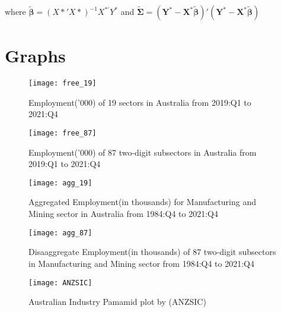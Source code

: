 \documentclass{monashthesis}
\begin{document}
where \(\boldsymbol{\tilde\beta} =(X*'X*)^{-1}X^{*'}Y^*\) and \(\tilde{\boldsymbol{\Sigma}}=(\boldsymbol{Y^*}-\boldsymbol{X^*}\boldsymbol{\tilde\beta})'(\boldsymbol{Y^*}-\boldsymbol{X^*}\boldsymbol{\tilde\beta})\)

\newpage

\hypertarget{graphs}{%
\chapter{Graphs}\label{graphs}}

\graphicspath{ {/Users/elvisyang/Desktop/hon_proj/Disaggregated_Employment/Honours_thesis/figures} }

\begin{figure}[t]
\texttt{[image: free\_19]}
\centering
\caption{Employment('000) of 19 sectors in Australia from 2019:Q1 to 2021:Q4}
\label{fig:19}
\end{figure}

\begin{figure}[t]
\texttt{[image: free\_87]}
\centering
\caption{Employment('000) of 87 two-digit subsectors in Australia from 2019:Q1 to 2021:Q4}
\label{fig:87}
\end{figure}

\begin{figure}[t]
\texttt{[image: agg\_19]}
\centering
\caption{Aggregated Employment(in thousands) for Manufacturing and Mining sector in Australia from 1984:Q4 to 2021:Q4}
\label{fig:a19}
\end{figure}

\begin{figure}[t]
\texttt{[image: agg\_87]}
\centering
\caption{Disaaggregate Employment(in thousands) of 87 two-digit subsectors in Manufacturing and Mining sector from 1984:Q4 to 2021:Q4}
\label{fig:a87}
\end{figure}

\begin{figure}[t]
\texttt{[image: ANZSIC]}
\centering
\caption{Australian Industry Pamamid plot by (ANZSIC)}
\label{fig:anzsic}
\end{figure}

\printbibliography[heading=bibintoc]
\end{document}
